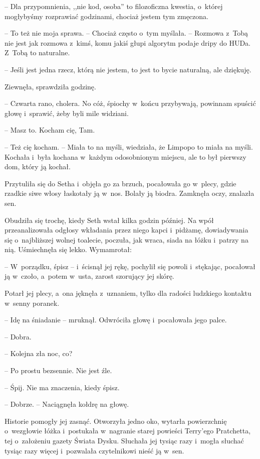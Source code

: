 \documentclass[oneside,polish,11pt,sfheadings]{mwbk}
\begin{document}
-- Dla przypomnienia, ,,nie kod, osoba'' to
filozoficzna kwestia, o~której mogłybyśmy rozprawiać godzinami, chociaż
jestem tym zmęczona.

-- To też nie moja sprawa. -- Chociaż często o~tym myślała. -- Rozmowa z~Tobą nie jest jak rozmowa z~kimś, komu jakiś głupi algorytm podaje dripy
do HUDa. Z~Tobą to naturalne.

-- Jeśli jest jedna rzecz, którą nie jestem, to jest to bycie naturalną,
ale dziękuję.

Ziewnęła, sprawdziła godzinę. 

-- Czwarta rano, cholera. No cóż, śpiochy w~końcu przybywają, powinnam spuścić głowę i~sprawić, żeby byli mile
widziani.

-- Masz to. Kocham cię, Tam.

-- Też cię kocham. -- Miała to na myśli, wiedziała, że Limpopo to miała na
myśli. Kochała i~była kochana w~każdym odosobnionym miejscu, ale to był
pierwszy dom, który ją kochał.

Przytuliła się do Setha i~objęła go za brzuch, pocałowała go w~plecy,
gdzie rzadkie siwe włosy łaskotały ją w~nos. Bolały ją biodra. Zamknęła
oczy, znalazła sen.

Obudziła się trochę, kiedy Seth wstał kilka godzin później. Na wpół
przeanalizowała odgłosy wkładania przez niego kapci i~pidżamę,
dowiadywania się o~najbliższej wolnej toalecie, poczuła, jak wraca,
siada na łóżku i~patrzy na nią. Uśmiechnęła się lekko. Wymamrotał: 

-- W~porządku, śpisz -- i~ścisnął jej rękę, pochylił się powoli i~stękając,
pocałował ją w~czoło, a~potem w~usta, zarost szorujący jej skórę.

Potarł jej plecy, a~ona jęknęła z~uznaniem, tylko dla radości ludzkiego
kontaktu w~senny poranek.

-- Idę na śniadanie -- mruknął. Odwróciła głowę i~pocałowała jego palce.

-- Dobra.

-- Kolejna zła noc, co?

-- Po prostu bezsennie. Nie jest źle.

-- Śpij. Nie ma znaczenia, kiedy śpisz.

-- Dobrze. -- Naciągnęła kołdrę na głowę.

Historie pomogły jej zasnąć. Otworzyła jedno oko, wytarła powierzchnię o~wezgłowie łóżka i~postukała w~nagranie starej powieści Terry'ego
Pratchetta, tej o~założeniu gazety Świata Dysku. Słuchała jej tysiąc
razy i~mogła słuchać tysiąc razy więcej i~pozwalała czytelnikowi nieść
ją w~sen.
\end{document}

